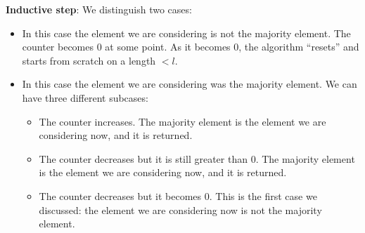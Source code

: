 \documentclass{article}
\begin{document}
\textbf{Inductive step}: We distinguish two cases:
\begin{itemize}
	\item In this case the element we are considering is not the majority element.
	The counter becomes 0 at some point. As it becomes 0, the algorithm
	``resets'' and starts from scratch on a length \(< l\).
	\item In this case the element we are considering was the majority element.
	We can have three different subcases:
	\begin{itemize}
		\item The counter increases. The majority element is the element we are
		considering now, and it is returned.
		\item The counter decreases but it is still greater than 0. The majority
		element is the element we are considering now, and it is returned.
		\item The counter decreases but it becomes 0.
		This is the first case we discussed: the element we are considering now
		is not the majority element.
	\end{itemize}
\end{itemize}
\end{document}
